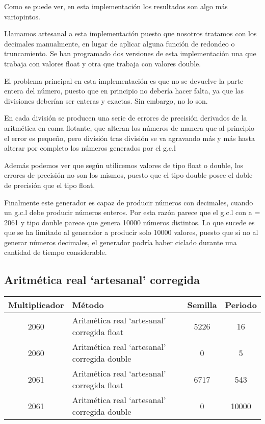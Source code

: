 Como se puede ver, en esta implementación los resultados son algo más variopintos.

Llamamos artesanal a esta implementación puesto que nosotros tratamos con los decimales manualmente, en lugar de aplicar alguna función de redondeo o truncamiento. Se han programado dos versiones de esta implementación una que trabaja con valores float y otra que trabaja con valores double.

El problema principal en esta implementación es que no se devuelve la parte entera del número, puesto que en principio no debería hacer falta, ya que las divisiones deberían ser enteras y exactas. Sin embargo, no lo son.

En cada división se producen una serie de errores de precisión derivados de la aritmética en coma flotante, que alteran los números de manera que al principio el error es pequeño, pero división tras división se va agravando más y más hasta alterar por completo los números generados por el g.c.l

Además podemos ver que según utilicemos valores de tipo float o double, los errores de precisión no son los mismos, puesto que el tipo double posee el doble de precisión que el tipo float.

Finalmente este generador es capaz de producir números con decimales, cuando un g.c.l debe producir números enteros. Por esta razón parece que el g.c.l con a = 2061 y tipo double parece que genera 10000 números distintos. Lo que sucede es que se ha limitado al generador a producir solo 10000 valores, puesto que si no al generar números decimales, el generador podría haber ciclado durante una cantidad de tiempo considerable.

\subsection{Aritmética real `artesanal' corregida}
\begin{table}[H]
\centering
\begin{tabular}{|c|l|c|c|}
\hline
\textbf{Multiplicador} & \textbf{Método} & \textbf{Semilla} & \textbf{Periodo} \\ \hline
2060 & Aritmética real `artesanal' corregida float & 5226 & 16 \\
2060 & Aritmética real `artesanal' corregida double & 0 & 5 \\
2061 & Aritmética real `artesanal' corregida float & 6717 & 543 \\
2061 & Aritmética real `artesanal' corregida double & 0 & 10000 \\ \hline
\end{tabular}
\end{table}

